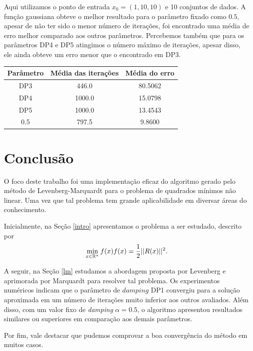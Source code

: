 \documentclass[12pt,a4paper]{article}
\newcounter{ex}[section]
\begin{document}
	
	Aqui utilizamos o ponto de entrada $x_0 = (1, 10, 10)$ e 10 conjuntos de dados. A função gaussiana obteve o melhor resultado para o parâmetro fixado como $0.5,$ apesar de não ter sido o menor número de iterações, foi encontrado uma média de erro melhor comparado aos outros parâmetros. Percebemos também que para os parâmetros DP4 e DP5 atingimos o número máximo de iterações, apesar disso, ele ainda obteve um erro menor que o encontrado em DP3.
	
	\begin{table}[H]
		\centering
		\begin{tabular}{|c|c|c|}
			\hline
			Parâmetro & Média das iterações & Média do erro\\
			\hline
			
			DP3 & 446.0 & 80.5062\\ \hline
			DP4 & 1000.0 & 15.0798\\ \hline
			DP5 & 1000.0 & 13.4543\\ \hline
			0.5 & 797.5 & 9.8600\\		\hline	
			
		\end{tabular}
	\end{table}

	
	\section{Conclusão}
	
	O foco deste trabalho foi uma implementação eficaz do algoritmo gerado pelo método de Levenberg-Marquardt para o problema de quadrados mínimos não linear. Uma vez que tal problema tem grande aplicabilidade em diversar áreas do conhecimento. 
	
	Inicialmente, na Seção \ref{intro} apresentamos o problema a ser estudado, descrito por 
	\begin{equation*}
	\min_{x \in \mathbb{R}^{n}} f(x) 
	\\	
	f(x) = \frac{1}{2}||R(x)||^2.
	\end{equation*}
	
	A seguir, na Seção \ref{lm} estudamos a abordagem proposta por Levenberg e aprimorada por Marquardt para resolver tal problema. 
	Os experimentos numéricos indicam que o parâmetro de $damping$ DP1 convergiu para a solução aproximada em um número de iterações
	muito inferior aos outros avaliados. Além disso, com um valor fixo de \textit{damping} $\alpha=0.5$, o algoritmo apresentou
	resultados similares ou superiores em comparação aos demais parâmetros.
	
	Por fim, vale destacar que pudemos comprovar a boa convergência do método em muitos casos.
	
	
	\nocite{aes}
	\nocite{friedlander1994elementos}
	\nocite{kab}
	
	
	
\end{document}
